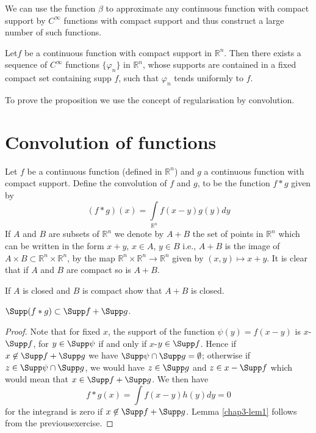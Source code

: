 We can use the function $\beta$ to approximate any continuous function with compact support by $C^{\infty}$ functions with compact support and thus construct a large number of such functions.

\begin{proposition}\label{chap3-prop1}
Let\pageoriginale $f$ be a continuous function with compact support in $\mathbb{R}^{n}$. Then there exists a sequence of $C^{\infty}$ functions $\{\varphi_{n}\}$ in $\mathbb{R}^{n}$, whose supports are contained in a fixed compact set containing supp $f$, such that $\varphi_{n}$ tends uniformly to $f$.
\end{proposition}

To prove the proposition we use the concept of regularisation by convolution.

\section*{Convolution of functions}

Let $f$ be a continuous function (defined in $\mathbb{R}^{n}$) and $g$ a continuous function with compact support. Define the convolution of $f$ and $g$, to be the function $f\ast g$ given by
$$
(f\ast g)(x)=\int\limits_{\mathbb{R}^{n}}f(x-y)g(y)dy
$$
If $A$ and $B$ are subsets of $\mathbb{R}^{n}$ we denote by $A+B$ the set of points in $\mathbb{R}^{n}$ which can be written in the form $x+y$, $x\in A$, $y\in B$ i.e., $A+B$ is the image of $A\times B\subset \mathbb{R}^{n}\times \mathbb{R}^{n}$, by the map $\mathbb{R}^{n}\times \mathbb{R}^{n}\to \mathbb{R}^{n}$ given by $(x,y)\mapsto x+y$. It is clear that if $A$ and $B$ are compact so is $A+B$.

\begin{exer*}
If $A$ is closed and $B$ is compact show that $A+B$ is closed.
\end{exer*}

\begin{lemma}\label{chap3-lem1}
$\Supp (f\ast g)\subset \Supp f+\Supp g$.
\end{lemma}

\begin{proof}
Note that for fixed $x$, the support of the function $\psi(y)=f(x-y)$ is $x$-$\Supp f$, for $y\in \Supp \psi$ if and only if $x$-$y\in \Supp f$. Hence if $x\not\in \Supp f+\Supp g$ we have $\Supp \psi \cap \Supp g=\emptyset$; otherwise if $z\in \Supp \psi \cap \Supp g$, we would have $z\in \Supp g$ and $z\in x - \Supp f$ which would mean that $x\in \Supp f + \Supp g$. We then have
$$
f\ast g(x)=\int f(x-y)h(y)dy=0
$$
for the integrand is zero if $x\not\in \Supp f+\Supp g$. Lemma \ref{chap3-lem1} follows from the previous\pageoriginale exercise.
\end{proof}

